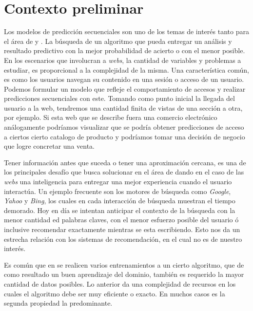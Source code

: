 
\section{Contexto preliminar}\label{sec:preliminar}

Los modelos de predicción secuenciales son uno de los temas de interés tanto para el área de \machinelearning  y \datacompression. La búsqueda de un algoritmo que pueda entregar un análisis  y resultado predictivo con la mejor probabilidad de acierto o con el menor posible.
En los escenarios que involucran a \emph{webs}, la cantidad de variables y problemas a estudiar, es proporcional a la complejidad de la misma. 
Una característica común, es como los usuarios navegan su contenido en una sesión o acceso de un usuario. Podemos formular un modelo que refleje el comportamiento de accesos y realizar predicciones secuenciales con este. Tomando como punto inicial la llegada del usuario a la web, tendremos una cantidad finita de vistas de una sección a otra, por ejemplo. Si esta web que se describe fuera una comercio electrónico análogamente podríamos visualizar que se podría obtener predicciones de acceso a ciertos cierto catalogo de producto y podríamos tomar una decisión de negocio que logre concretar una venta. 

Tener información antes que suceda o tener una aproximación cercana, es una de los principales desafío que busca solucionar en el área  de \machinelearning dando en el caso de las \emph{webs} una inteligencia para entregar una mejor experiencia cuando el usuario interactúa. Un ejemplo frecuente son los motores de búsqueda como \emph{Google}, \emph{Yahoo} y \emph{Bing}, los cuales en cada interacción de búsqueda muestran el tiempo demorado. Hoy en día se intentan anticipar el contexto de la búsqueda con la menor cantidad ed palabras claves, con el menor esfuerzo posible del usuario ó inclusive recomendar exactamente mientras se esta escribiendo. Esto nos da un estrecha relación con los sistemas de recomendación, en el cual no es de nuestro interés. 

Es común que en \machinelearning se realicen varios entrenamientos a un cierto algoritmo, que de como resultado un buen aprendizaje del dominio, también es requerido la mayor cantidad de datos posibles. Lo anterior da una complejidad de recursos en los cuales el algoritmo debe ser muy eficiente o exacto. En muchos casos es la segunda propiedad la predominante. 


